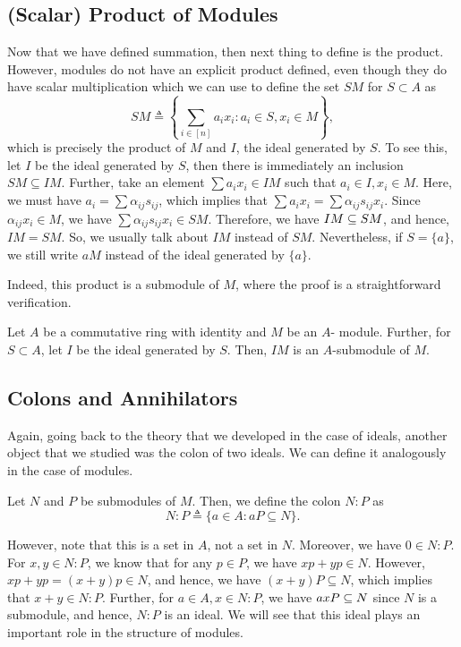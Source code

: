 \subsection{(Scalar) Product of Modules}
Now that we have defined summation, then next thing to define is the product. However, modules do not have an explicit product defined, even though they do have scalar multiplication which we can use to define the set $SM$ for $S \subset A$ as
\[
SM\triangleq \left\{\sum_{i\in [n]} a_i x_i\colon a_i \in S, x_i \in M \right\} ,
\]
which is precisely the product of $M$ and $I$, the ideal generated by $S$. To see this, let $I$ be the ideal generated by $S$, then there is immediately an inclusion $S M \subseteq I M$. Further, take an element $\sum a_{i} x_{i} \in IM$ such that $a_{i} \in I, x_{i} \in M$. Here, we must have $a_{i}=\sum \alpha_{i j} s_{i j}$, which implies that $\sum a_{i} x_{i}=\sum \alpha_{i j} s_{i j} x_{i}$. Since $\alpha_{i j} x_{i} \in M$, we have $\sum \alpha_{i j} s_{i j} x_{i} \in S M$. Therefore, we have $I M \ss S M$, and hence, $IM = SM$. So, we usually talk about $IM$ instead of $SM$. Nevertheless, if $S=\{a\}$, we still write $a M$ instead of the ideal generated by $\{a\}$. 

Indeed, this product is a submodule of $M$, where the proof is a straightforward verification.
\begin{proposition}
    Let $A$ be a commutative ring with identity and $M$ be an $A$- module. Further, for $S \subset A$, let $I$ be the ideal generated by $S$. Then, $IM$ is an $A$-submodule of $M$. 
\end{proposition}

\subsection{Colons and Annihilators}
Again, going back to the theory that we developed in the case of ideals, another object that we studied was the colon of two ideals. We can define it analogously in the case of modules.
\begin{definition}\label{def: colon-modules}
    Let $N$ and $P$ be submodules of $M$. Then, we define the colon $N: P$ as
    \[
    N:P \triangleq \{a \in A: a P \subseteq N\}.
    \]
\end{definition}
However, note that this is a set in $A$, not a set in $N$. Moreover, we have  $0 \in N: P$. For $x,y \in N:P$, we know that for any $p \in P$, we have $xp + yp \in N$. However, $xp+yp = (x+y)p \in N$, and hence, we have $(x+y) P \subseteq N$, which implies that $x+y \in N: P$. Further, for $a\in A, x \in N:P$, we have
$axP \ss N$ since $N$ is a submodule, and hence, $N:P$ is an ideal. We will see that this ideal plays an important role in the structure of modules.

